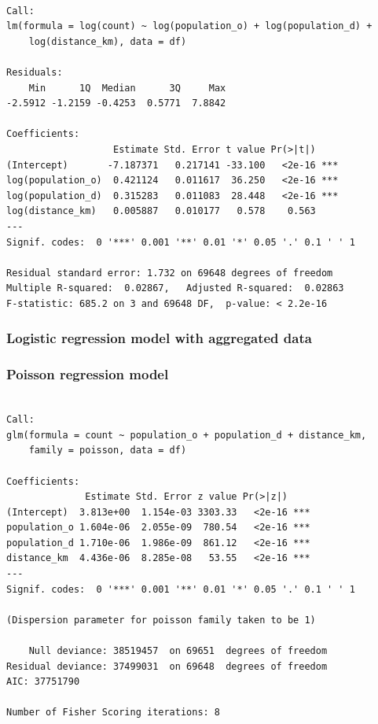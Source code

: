 \documentclass[
  a4paper, 
  twoside,
  final
]{article}
\newcounter{code}
\begin{document}
\begin{verbatim}

Call:
lm(formula = log(count) ~ log(population_o) + log(population_d) + 
    log(distance_km), data = df)

Residuals:
    Min      1Q  Median      3Q     Max 
-2.5912 -1.2159 -0.4253  0.5771  7.8842 

Coefficients:
                   Estimate Std. Error t value Pr(>|t|)    
(Intercept)       -7.187371   0.217141 -33.100   <2e-16 ***
log(population_o)  0.421124   0.011617  36.250   <2e-16 ***
log(population_d)  0.315283   0.011083  28.448   <2e-16 ***
log(distance_km)   0.005887   0.010177   0.578    0.563    
---
Signif. codes:  0 '***' 0.001 '**' 0.01 '*' 0.05 '.' 0.1 ' ' 1

Residual standard error: 1.732 on 69648 degrees of freedom
Multiple R-squared:  0.02867,   Adjusted R-squared:  0.02863 
F-statistic: 685.2 on 3 and 69648 DF,  p-value: < 2.2e-16
\end{verbatim}

\subsubsection{Logistic regression model with aggregated
data}\label{logistic-regression-model-with-aggregated-data}

\subsubsection{Poisson regression model}\label{poisson-regression-model}

\begin{verbatim}

Call:
glm(formula = count ~ population_o + population_d + distance_km, 
    family = poisson, data = df)

Coefficients:
              Estimate Std. Error z value Pr(>|z|)    
(Intercept)  3.813e+00  1.154e-03 3303.33   <2e-16 ***
population_o 1.604e-06  2.055e-09  780.54   <2e-16 ***
population_d 1.710e-06  1.986e-09  861.12   <2e-16 ***
distance_km  4.436e-06  8.285e-08   53.55   <2e-16 ***
---
Signif. codes:  0 '***' 0.001 '**' 0.01 '*' 0.05 '.' 0.1 ' ' 1

(Dispersion parameter for poisson family taken to be 1)

    Null deviance: 38519457  on 69651  degrees of freedom
Residual deviance: 37499031  on 69648  degrees of freedom
AIC: 37751790

Number of Fisher Scoring iterations: 8
\end{verbatim}
\end{document}
